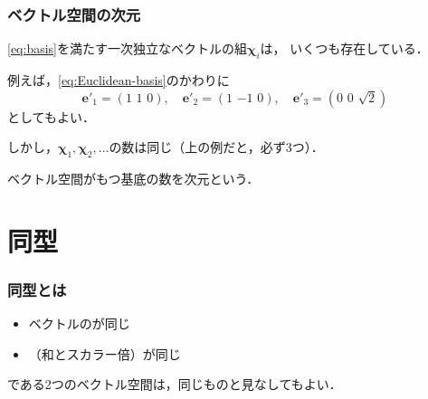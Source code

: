 \documentclass[
    10pt,
    ]{sotsu-beamer}
\begin{document}
\begin{frame}
    \frametitle{ベクトル空間の次元}

    \eqref{eq:basis}を満たす一次独立なベクトルの組$\symbf{\chi}_i$は，
    いくつも存在している．

    例えば，\eqref{eq:Euclidean-basis}のかわりに
    \begin{equation*}
        \symbf{e}'_1 = (1 \,\, 1 \,\, 0), \quad 
        \symbf{e}'_2 = (1 \,\, {-1} \,\, 0), \quad
        \symbf{e}'_3 = (0 \,\, 0 \,\, \sqrt{2})
    \end{equation*}
    としてもよい．

    しかし，$\symbf{\chi}_1, \symbf{\chi}_2, \dotsc$の数は同じ（上の例だと，必ず3つ）．

    ベクトル空間がもつ基底の数を\alert{次元}という．


\end{frame}


\section{同型}


\begin{frame}
    \frametitle{同型とは}

    \begin{itemize}
        \item ベクトルのが同じ
        \item {}（和とスカラー倍）が同じ
    \end{itemize}
    である2つのベクトル空間は，同じものと見なしてもよい．
    
\end{frame}
\end{document}
